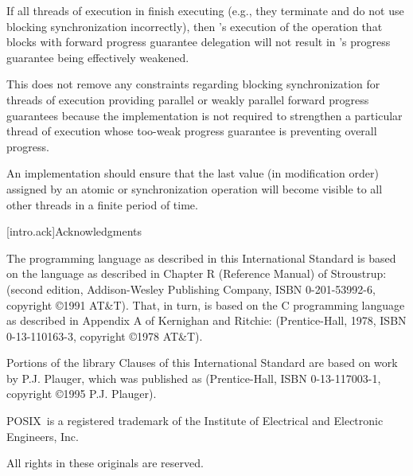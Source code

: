 \pnum
\begin{note}
If all threads of execution in  finish executing (e.g., they terminate
and do not use blocking synchronization incorrectly), then 's execution
of the operation that blocks with forward progress guarantee delegation will not
result in 's progress guarantee being effectively weakened.
\end{note}

\pnum
\begin{note}
This does not remove any constraints regarding blocking synchronization for
threads of execution providing parallel or weakly parallel forward progress
guarantees because the implementation is not required to strengthen a particular
thread of execution whose too-weak progress guarantee is preventing overall progress.
\end{note}

\pnum
An implementation should ensure that the last value (in modification order)
assigned by an atomic or synchronization operation will become visible to all
other threads in a finite period of time.%
%

[intro.ack]{Acknowledgments}

\pnum
The \Cpp  programming language as described in this International
Standard is based on the language as described in Chapter R (Reference
Manual) of Stroustrup:  (second
edition, Addison-Wesley Publishing Company, ISBN 0-201-53992-6,
copyright \copyright 1991 AT\&T). That, in turn, is based on the C
programming language as described in Appendix A of Kernighan and
Ritchie:  (Prentice-Hall, 1978, ISBN
0-13-110163-3, copyright \copyright 1978 AT\&T).

\pnum
Portions of the library Clauses of this International Standard are based
on work by P.J. Plauger, which was published as  (Prentice-Hall, ISBN 0-13-117003-1, copyright
\copyright 1995 P.J. Plauger).

\pnum
POSIX\textregistered\ is a registered trademark of the Institute of Electrical and
Electronic Engineers, Inc.

\pnum
All rights in these originals are reserved.
